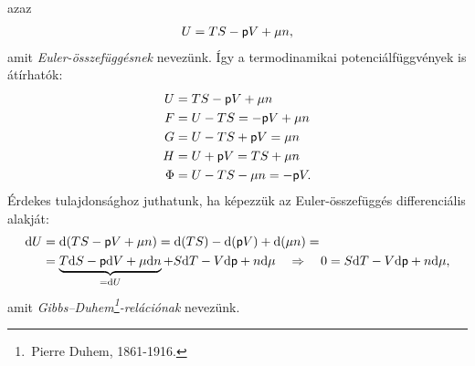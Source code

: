 azaz
\begin{align}
	U=TS-\mathsf p V+\mu n,
\end{align}
amit \emph{Euler-összefüggésnek} nevezünk. Így a termodinamikai potenciálfüggvények is átírhatók:
\begin{align}
	U &= TS-\mathsf p V +\mu n\\
	F &= U-TS = -\mathsf p V+\mu n\\
	G &= U-TS+\mathsf p V = \mu n\\
	H &= U+\mathsf p V = TS+\mu n\\
	\Phi &= U-TS-\mu n = -\mathsf p V.
\end{align}
Érdekes tulajdonsághoz juthatunk, ha képezzük az Euler-összefüggés differenciális alakját:
\begin{align}
\begin{split}
	\mathrm{d}U &= \mathrm{d}(TS-\mathsf p V+\mu n) = \mathrm{d}(TS)-\mathrm{d}(\mathsf p V)+\mathrm{d}(\mu n) =\\
	&= \underbrace{T\mathrm{d}S-\mathsf p \mathrm{d}V+\mu \mathrm{d}n}_{=\mathrm{d}U} +S\mathrm{d}T-V\mathrm{d}\mathsf p +n\mathrm{d}\mu \quad\Rightarrow\quad 0 = S\mathrm{d}T-V\mathrm{d}\mathsf p +n\mathrm{d}\mu,
\end{split}
\end{align}
amit \emph{Gibbs--Duhem\footnote{\,Pierre Duhem, 1861-1916.}-relációnak} nevezünk.